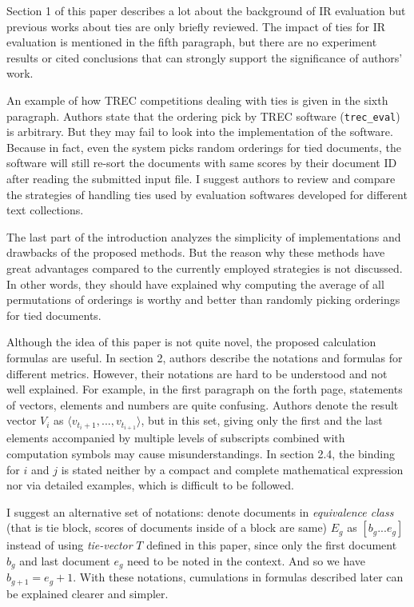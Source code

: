 \documentclass{article}
\begin{document}
Section 1 of this paper describes a lot about the background of IR evaluation but previous works about ties are only briefly reviewed. The impact of ties for IR evaluation is mentioned in the fifth paragraph, but there are no experiment results or cited conclusions that can strongly support the significance of authors' work. 

An example of how TREC competitions dealing with ties is given in the sixth paragraph. Authors state that the ordering pick by TREC software (\texttt{trec\_eval}) is arbitrary. But they may fail to look into the implementation of the software. Because in fact, even the system picks random orderings for tied documents, the software will still re-sort the documents with same scores by their document ID after reading the submitted input file. I suggest authors to review and compare the strategies of handling ties used by evaluation softwares developed for different text collections.

The last part of the introduction analyzes the simplicity of implementations and drawbacks of the proposed methods. But the reason why these methods have great advantages compared to the currently employed strategies is not discussed. In other words, they should have explained why computing the average of all permutations of orderings is worthy and better than randomly picking orderings for tied documents.

Although the idea of this paper is not quite novel, the proposed calculation formulas are useful. In section 2, authors describe the notations and formulas for different metrics. However, their notations are hard to be understood and not well explained. For example, in the first paragraph on the forth page, statements of vectors, elements and numbers are quite confusing. Authors denote the result vector $V_i$ as $\langle v_{t_i +1},...,v_{t_{i+1}} \rangle$, but in this set, giving only the first and the last elements accompanied by multiple levels of subscripts combined with computation symbols may cause misunderstandings. In section 2.4, the binding for $i$ and $j$ is stated neither by a compact and complete mathematical expression nor via detailed examples, which is difficult to be followed. 

I suggest an alternative set of notations: denote documents in \textit{equivalence class} (that is tie block, scores of documents inside of a block are same) $E_g$ as $[b_g...e_g]$ instead of using \textit{tie-vector} $T$ defined in this paper, since only the first document $b_g$ and last document $e_g$ need to be noted in the context. And so we have $b_{g+1} = e_g + 1$. With these notations, cumulations in formulas described later can be explained clearer and simpler.
\end{document}
